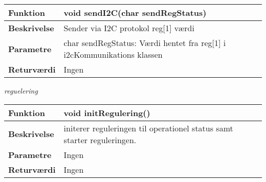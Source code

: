 \begin{center}
    \begin{tabular}{ | l | p{10cm} |}
    \hline
    \textbf{Funktion}	 	& void sendI2C(char sendRegStatus)								\\ \hline
    \textbf{Beskrivelse} 	& Sender via I2C protokol reg[1] værdi				\\ \hline
    \textbf{Parametre}		& char sendRegStatus: Værdi hentet fra reg[1] i i2cKommunikations klassen\\ \hline
    \textbf{Returværdi} 	& Ingen		 												\\ \hline
    \end{tabular}
\end{center}

\textit{reguelering} \\
\begin{center}
    \begin{tabular}{ | l | p{10cm} |}
    \hline
    \textbf{Funktion}	 	& void initRegulering()										\\ \hline
    \textbf{Beskrivelse} 	& initerer reguleringen til operationel status samt starter reguleringen.			\\ \hline
    \textbf{Parametre}		& Ingen												 		\\ \hline
    \textbf{Returværdi} 	& Ingen		 												\\ \hline
    \end{tabular}
\end{center}

